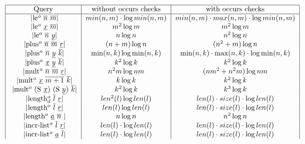 \begin{figure}[t]
    \[
      \begin{tabular}{|c|c|c|}
           \hline
           Query & without occurs checks & with occurs checks \\
           \hline
           \lstinline|le$^o$ $\overline{n}$ $\overline{m}$| & 
           $min(n, m) \cdot \log min (n, m)$ & $min(n, m) \cdot max(n, m) \cdot \log min (n, m)$ \\
           \lstinline|le$^o$ $\underline{x}$ $\overline{m}$| & $m^2 \log m$ & $m^2 \log m$  \\
           \lstinline|le$^o$ $\overline{n}$ $\underline{y}$| & $n \log n$ & $n^2 \log n$  \\
           \lstinline|plus$^o$ $\overline{n}$ $\overline{m}$ $\underline{r}$| & $(n + m) \log n$ & $(n^2 + m) \log n$ \\
           \lstinline|plus$^o$ $\overline{n}$ $\underline{y}$ $\overline{k}$| & $\min(n, k) \log \min(n, k)$ & $\min(n, k) \cdot \max(n, k) \cdot \log \min(n, k)$ \\
           \lstinline|plus$^o$ $\underline{x}$ $\underline{y}$ $\overline{k}$| & $k^2 \log k$ & $k^2 \log k$  \\
           \lstinline|mult$^o$ $\overline{n}$ $\overline{m}$ $\underline{r}$| & $n^2 m \log n m$ & $(n m^2 + n^2 m) \log n m$  \\
           \lstinline|mult$^o$ $\underline{x}$ $\overline{m + 1}$ $\overline{k}$| & $k \log k$ & $k^2 \log k$ \\
           \lstinline|mult$^o$ (S $ \underline{x}$) (S $\underline{y}$) $\overline{k}$| & $k^2 \log k$ & $k^3 \log k$ \\
           \lstinline|length$_d^o$ $\overline{l}$ $\underline{r}$| & $len^2(l) \log len(l)$ & $len(l) \cdot size(l) \cdot \log len(l)$ \\
           \lstinline|length$^o$ $\overline{l}$ $\underline{r}$| & $len(l) \log len(l)$ & $len(l) \cdot size(l) \cdot \log len(l)$ \\
           \lstinline|length$^o$ $\underline{a}$ $\overline{n}$ | & $n \log n$ & $n^2 \log n$  \\
           \lstinline|incr-list$^o$ $\overline{l}$ $\underline{r}$| & $len(l) \cdot \log len(l)$ & $len(l) \cdot size(l) \cdot \log len(l)$ \\
           \lstinline|incr-list$^o$ $\underline{a}$ $\overline{l}$| & $len(l) \cdot \log len(l)$ & $len(l) \cdot size(l) \cdot \log len(l)$ \\

\end{tabular}\]
\end{figure}
